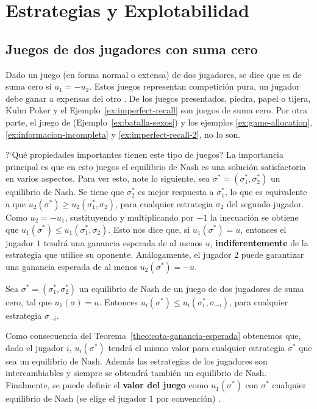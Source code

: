 \chapter{Estrategias y Explotabilidad}
\label{chapter:explotabilidad}


\section{Juegos de dos jugadores con suma cero}
\label{section:dos-jugadores-suma-cero}
Dado un juego (en forma normal o extensa) de dos jugadores, se dice que es de suma cero si $u_1 = -u_2$. Estos juegos representan competición pura, un jugador debe ganar a expensas del otro \cite[p.~5]{bib:handbook-blai}. De los juegos presentados, piedra, papel o tijera, Kuhn Poker y el Ejemplo~\ref{ex:imperfect-recall} son juegos de suma cero. Por otra parte, el juego de  (Ejemplo~\ref{ex:batalla-sexos}) y los  ejemplos \ref{ex:game-allocation}, \ref{ex:informacion-incompleta} y \ref{ex:imperfect-recall-2}, no lo son.

?`Qué propiedades importantes tienen este tipo de juegos? La importancia principal es que en esto juegos el equilibrio de Nash es una solución satisfactoria en varios aspectos. Para ver esto, note lo siguiente, sea $\sigma^* = (\sigma^*_1, \sigma^*_2)$ un equilibrio de Nash. Se tiene que $\sigma^*_2$ es mejor respuesta a $\sigma^*_1$, lo que es equivalente a que $u_2(\sigma^*) \geq u_2(\sigma^*_1, \sigma_2)$, para cualquier estrategia $\sigma_2$ del segundo jugador. Como $u_2 = -u_1$, sustituyendo y multiplicando por $-1$ la inecuación se obtiene que $u_1(\sigma^*) \leq u_1(\sigma^*_1, \sigma_2)$. Esto nos dice que, si $u_1(\sigma^*) = u$, entonces el jugador $1$ tendrá una ganancia esperada de al menos $u$, \textbf{indiferentemente} de la estrategia que utilice su oponente. Análogamente, el jugador $2$ puede garantizar una ganancia esperada de al menos $u_2(\sigma^*) = -u$.

\begin{theorem}
\label{theo:cota-ganancia-esperada}
Sea $\sigma^* = (\sigma^*_1, \sigma^*_2)$ un equilibrio de Nash de un juego de dos jugadores de suma cero, tal que $u_1(\sigma) = u$. Entonces $u_i(\sigma^*) \leq u_i(\sigma^*_i, \sigma_{-i})$, para cualquier estrategia $\sigma_{-i}$.  
\end{theorem}

Como consecuencia del Teorema~\ref{theo:cota-ganancia-esperada} obtenemos que, dado el jugador $i$, $u_i(\sigma^*)$ tendrá el mismo valor para cualquier estrategia $\sigma^*$ que sea un equilibrio de Nash. Además las estrategias de los jugadores son intercambiables y siempre se obtendrá también un equilibrio de Nash. Finalmente, se puede definir el \textbf{valor del juego} como $u_1(\sigma^*)$ con $\sigma^*$ cualquier equilibrio de Nash (se elige el jugador $1$ por convención) \cite[p.~17]{bib:handbook-blai}.

